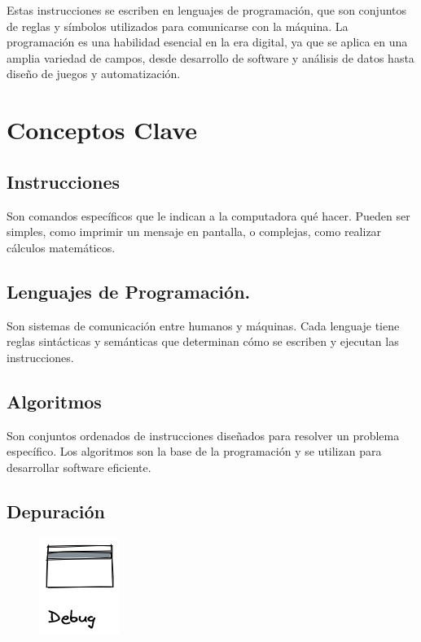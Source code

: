 \documentclass[
  a4paper,
  DIV=11,
  numbers=noendperiod,
  onepage,
  openany]{scrreprt}
\begin{document}
Estas instrucciones se escriben en lenguajes de programación, que son
conjuntos de reglas y símbolos utilizados para comunicarse con la
máquina. La programación es una habilidad esencial en la era digital, ya
que se aplica en una amplia variedad de campos, desde desarrollo de
software y análisis de datos hasta diseño de juegos y automatización.

\section{Conceptos Clave}\label{conceptos-clave}

\subsection{Instrucciones}\label{instrucciones}

Son comandos específicos que le indican a la computadora qué hacer.
Pueden ser simples, como imprimir un mensaje en pantalla, o complejas,
como realizar cálculos matemáticos.

\subsection{Lenguajes de
Programación.}\label{lenguajes-de-programaciuxf3n.}

Son sistemas de comunicación entre humanos y máquinas. Cada lenguaje
tiene reglas sintácticas y semánticas que determinan cómo se escriben y
ejecutan las instrucciones.

\subsection{Algoritmos}\label{algoritmos}

Son conjuntos ordenados de instrucciones diseñados para resolver un
problema específico. Los algoritmos son la base de la programación y se
utilizan para desarrollar software eficiente.

\subsection{Depuración}\label{depuraciuxf3n}

\begin{figure}

{\centering \includegraphics{unidades/unidad1/images/debug.png}

}

\end{figure}
\end{document}
